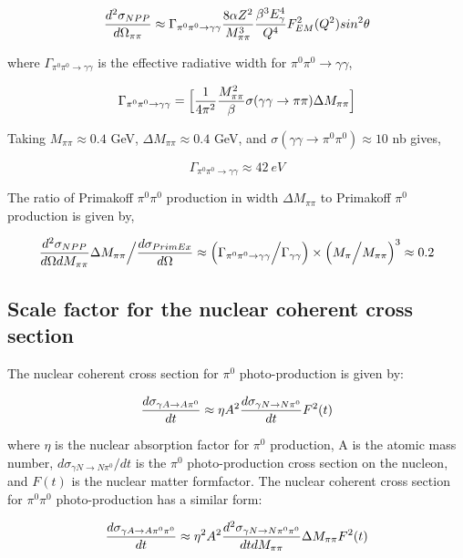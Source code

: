 $$ {d^2 \sigma_{NPP} \over d \Omega_{\pi \pi} } \approx
\Gamma_{\pi^0 \pi^0 \rightarrow \gamma \gamma}  { 8 \alpha Z^2 \over M^3_{\pi \pi} }
{ \beta^3 E_\gamma^4 \over Q^4 } F^2_{EM}(Q^2) sin^2 \theta  $$

where  $\Gamma_{\pi^0 \pi^0 \rightarrow \gamma \gamma}$ is the effective radiative width for $\pi^0 \pi^0 \rightarrow \gamma \gamma$, 

$$ \Gamma_{\pi^0 \pi^0 \rightarrow \gamma \gamma} =\Big[ {1 \over 4 \pi^2 }  {M^2_{\pi \pi} \over \beta }  \sigma( \gamma \gamma \rightarrow \pi \pi) \Delta M_{\pi \pi} \Big] $$

Taking $M_{\pi \pi} \approx 0.4$ GeV, $\Delta M_{\pi \pi}\approx 0.4$ GeV, and $\sigma ( \gamma \gamma \rightarrow \pi^0 \pi^0) \approx 10$ nb gives, 

$$\Gamma_{\pi^0 \pi^0 \rightarrow \gamma \gamma} \approx 42\ eV$$

The ratio of Primakoff $\pi^0 \pi^0$ production in width $\Delta M_{\pi \pi}$  to Primakoff $\pi^0$ production is given by, 

$$  {d^2\sigma_{NPP} \over d\Omega dM_{\pi \pi}} \Delta M_{\pi \pi} \Big/ { d\sigma_{PrimEx} \over d\Omega} 
\approx 
\Big(\Gamma_{\pi^0 \pi^0 \rightarrow \gamma \gamma} 
\Big/ \Gamma_{\gamma \gamma} \Big)
\times \Big( M_\pi \Big/ 
M_{\pi \pi}\Big)^3
\approx 0.2$$

 \subsection{Scale factor for the nuclear coherent cross section}

The nuclear coherent cross section for  $\pi^0$ photo-production is given by: 

$$ {d\sigma_{\gamma A \rightarrow A  \pi^0 } \over dt } \approx \eta A^2 { d\sigma_{\gamma N \rightarrow N \pi^0 } \over dt } F^2(t) $$

where $\eta$ is the nuclear absorption factor for $\pi^0$ production, A is the atomic mass number, $d\sigma_{\gamma N \rightarrow N\pi^0 } / dt$ is the $\pi^0$ photo-production cross section on the nucleon, and $F(t)$ is the nuclear matter formfactor.  The nuclear coherent cross section for  $\pi^0 \pi^0$ photo-production has a similar form: 

$$ {d\sigma_{\gamma A \rightarrow A  \pi^0 \pi^0} \over dt } \approx  \eta^2 A^2 { d^2 \sigma_{\gamma N \rightarrow N \pi^0 \pi^0} \over dt dM_{\pi \pi}}\Delta M_{\pi \pi} F^2(t) $$

